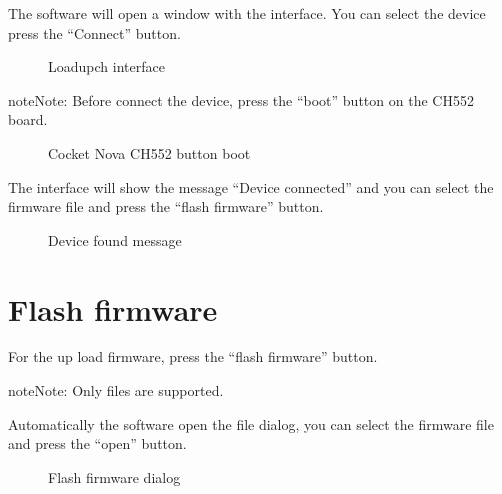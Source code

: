 \documentclass[letterpaper,10pt,english]{sphinxmanual}
\begin{document}
\sphinxAtStartPar
The software will open a window with the interface. You can select the device press the “Connect” button.

\begin{figure}[htbp]
\centering
\capstart

\noindent{}
\caption{Loadupch interface}\label{\detokenize{usage:id1}}\label{\detokenize{usage:figure-connect}}\end{figure}

\begin{sphinxadmonition}{note}{Note:}
\sphinxAtStartPar
Before connect the device, press the “boot” button on the CH552 board.
\end{sphinxadmonition}

\begin{figure}[htbp]
\centering
\capstart

\noindent{}
\caption{Cocket Nova CH552 button boot}\label{\detokenize{usage:id2}}\label{\detokenize{usage:figure-flash}}\end{figure}

\sphinxAtStartPar
The interface will show the message “Device connected” and you can select the firmware file and press the “flash firmware” button.

\begin{figure}[htbp]
\centering
\capstart

\noindent{}
\caption{Device found message}\label{\detokenize{usage:id3}}\label{\detokenize{usage:figure-message}}\end{figure}


\chapter{Flash firmware}
\label{\detokenize{usage:flash-firmware}}
\sphinxAtStartPar
For the up load firmware, press the “flash firmware” button.

\begin{sphinxadmonition}{note}{Note:}
\sphinxAtStartPar
Only  files are supported.
\end{sphinxadmonition}

\sphinxAtStartPar
Automatically the software open the file dialog, you can select the firmware file and press the “open” button.

\begin{figure}[htbp]
\centering
\capstart

\noindent{}
\caption{Flash firmware dialog}\label{\detokenize{usage:id4}}\label{\detokenize{usage:figure-flash-firmware}}\end{figure}
\end{document}
